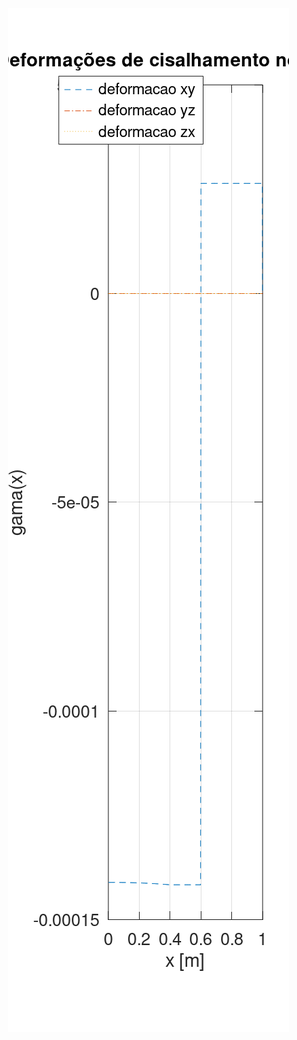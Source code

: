\documentclass[10pt]{article}
\begin{document}
\begin{center}
    \includegraphics[scale=0.25]{figure25.png}

\end{center}
\end{document}
